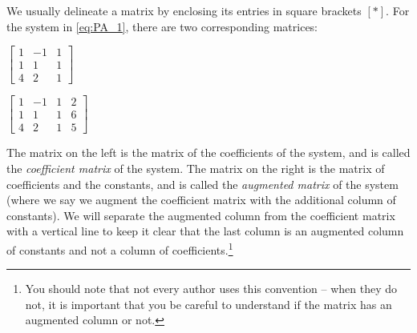 We usually delineate a matrix by enclosing its entries in square brackets $[ * ]$. For the system in \eqref{eq:PA_1}, there are two corresponding matrices: 
\begin{center}
\begin{minipage}{2.0in}
\begin{center}
$\left[ \begin{array}{rrr} 1 	&-1 	&1 	\\ 1	&1		&1	\\ 4	&2		&1 \end{array} \right]$ 
\end{center}
\end{minipage}
\begin{minipage}{2.0in}
\begin{center}
$\left[ \begin{array}{rrr|r} 1 	&-1 	&1 &2 	\\ 1	&1		&1 &6	 \\ 4	 &2		&1 &5 \end{array} \right]$
\end{center}
\end{minipage}
\end{center}
The matrix on the left is the matrix of the coefficients of the system, and is called the \emph{coefficient matrix} of the system. The matrix on the right is the matrix of coefficients and the constants, and is called the \emph{augmented matrix} of the system (where we say we augment the coefficient matrix with the additional column of constants). We will separate the augmented column from the coefficient matrix with a vertical line to keep it clear that the last column is an augmented column of constants and not a column of coefficients.\footnote{You should note that not every author uses this convention -- when they do not, it is important that you be careful to understand if the matrix has an augmented column or not.}


